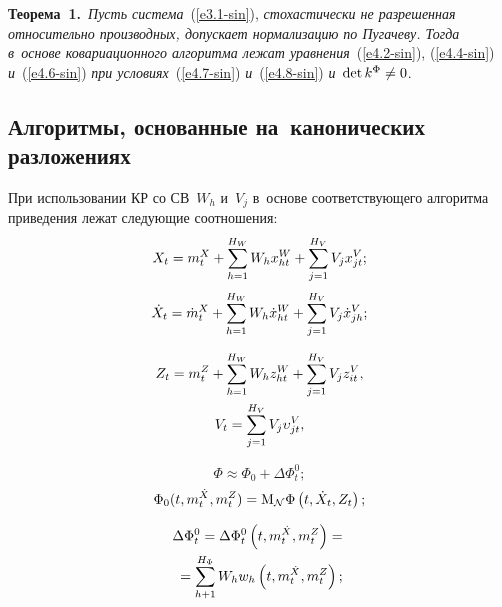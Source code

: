 \begin{multicols}{2}
\smallskip

\noindent
\textbf{Теорема~1.}\ \textit{Пусть сис\-те\-ма}~(\ref{e3.1-sin}), 
\textit{стохастически не разрешенная относительно производных,
 допускает нормализацию по Пугачеву. Тогда в~основе ковариационного алгоритма лежат 
 уравнения}~(\ref{e4.2-sin}), (\ref{e4.4-sin}) \textit{и}~(\ref{e4.6-sin}) \textit{при 
 условиях}~(\ref{e4.7-sin}) \textit{и}~(\ref{e4.8-sin}) \textit{и}~$\det k^\Phi\hm\ne 0$.
 
 \smallskip


\subsection{Алгоритмы, основанные на~канонических разложениях} 

При использовании КР со СВ~$W_h$ и~$V_j$ в~основе соответствующего алгоритма 
приведения лежат сле\-ду\-ющие соотношения:
\begin{equation}
X_t = m_t^X +\sum\limits_{h=1}^{H_W} W_h x_{ht}^W +\sum\limits_{j=1}^{H_V} V_j x_{jt}^V;
    \label{e4.9-sin}
    \end{equation}
\begin{equation}
\dot X_t =\dot m_t^X + \sum\limits_{h=1}^{H_W} W_h \dot x_{ht}^W + 
    \sum\limits_{j=1}^{H_V} V_j \dot x_{jh}^V;
    \label{e4.10-sin}
    \end{equation}
    
    \vspace*{-12pt}
    
    \noindent
\begin{multline}
Z_t = m_t^Z + \sum\limits_{h=1}^{H_W} W_h z_{ht}^W+ \sum\limits_{j=1}^{H_V} V_jz_{it}^V,\\ 
    V_t=\sum\limits_{j=1}^{H_V} V_j \upsilon_{jt}^V,
    \label{e4.11-sin}
    \end{multline}
    
    \noindent
\begin{equation}
\Phi \approx \Phi_0+\Delta\Phi_t^0;
    \label{e4.12-sin}
    \end{equation}
\begin{equation}
\Phi_0 (t, m_t^{\dot X}, m_t^Z) = \mathrm{M}_{\cal N} \Phi \left(t, \dot X_t, Z_t\right);
    \label{e4.13-sin}
    \end{equation}
    
    \vspace*{-12pt}
    
    \noindent
\begin{multline}
\Delta \Phi_t^0 =\Delta\Phi_t^0 \left(t, m_t^{\dot X}, m_t^Z\right) ={}\\
{}= \sum\limits_{h+1}^{H_\Phi} 
    W_h w_h\left(t, m_t^{\dot X}, m_t^Z\right);
    \label{e4.14-sin}
    \end{multline}
    

\end{multicols}
